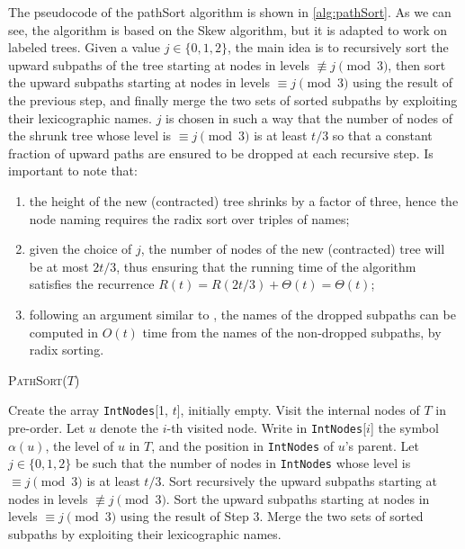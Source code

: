 The pseudocode of the pathSort algorithm is shown in \cref{alg:pathSort}. As we can see, the algorithm is based on the Skew algorithm, but it is adapted to work on labeled trees. 
Given a value $j\in\{0,1,2\}$, the main idea is to recursively sort the upward subpaths of the tree starting at nodes in levels $\not\equiv j \pmod{3}$, then sort the upward subpaths starting at nodes in levels $\equiv j \pmod{3}$ using the result of the previous step, and finally merge the two sets of sorted subpaths by exploiting their lexicographic names. $j$ is chosen in such a way that the number of nodes of the shrunk tree whose level is $\equiv j \pmod{3}$ is at least $t/3$ so that a constant fraction of upward paths are ensured to be dropped at each recursive step.
Is important to note that:
\begin{enumerate}
    \item the height of the new (contracted) tree shrinks by a factor of three, hence the node naming requires the radix sort over triples of names; 
    \item given the choice of $j$, the number of nodes of the new (contracted) tree will be at most $2t/3$, thus ensuring that the running time of the algorithm satisfies the recurrence $R(t) = R(2t/3) + \Theta(t) = \Theta(t)$; 
    \item following an argument similar to \cite{karkkainen2006linear}, the names of the dropped subpaths can be computed in $O(t)$ time from the names of the non-dropped subpaths, by radix sorting.
\end{enumerate}

\begin{algorithm}
    \caption{\textsc{PathSort}($T$)}
    \label{alg:pathSort}
    \begin{algorithmic}[1]
    \State Create the array \texttt{IntNodes}[1, $t$], initially empty.
    \State Visit the internal nodes of $T$ in pre-order. Let $u$ denote the $i$-th visited node.
    \State Write in \texttt{IntNodes}[$i$] the symbol $\alpha(u)$, the level of $u$ in $T$, and the position in \texttt{IntNodes} of $u$'s parent.
    \State Let $j \in \{0, 1, 2\}$ be such that the number of nodes in \texttt{IntNodes} whose level is $\equiv j \pmod{3}$ is at least $t/3$. Sort recursively the upward subpaths starting at nodes in levels $\not\equiv j \pmod{3}$.
    \State Sort the upward subpaths starting at nodes in levels $\equiv j \pmod{3}$ using the result of Step 3.
    \State Merge the two sets of sorted subpaths by exploiting their lexicographic names.
    \end{algorithmic}
\end{algorithm}

